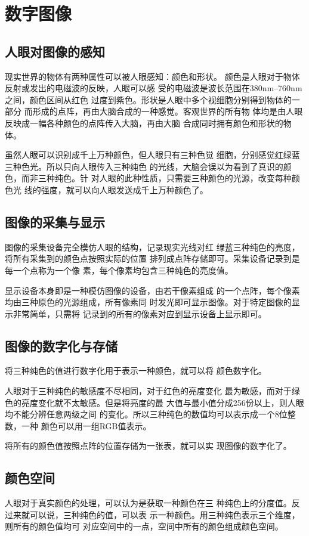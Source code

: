 \documentclass[11pt]{article}
\begin{document}
\section{数字图像}
\subsection{人眼对图像的感知}
    现实世界的物体有两种属性可以被人眼感知：颜色和形状。
颜色是人眼对于物体反射或发出的电磁波的反映，人眼可以感
受的电磁波是波长范围在380nm--760nm之间，颜色区间从红色
过度到紫色。形状是人眼中多个视细胞分别得到物体的一部分
而形成的点阵，再由大脑合成的一种感觉。客观世界的所有物
体均是由人眼反映成一幅各种颜色的点阵传入大脑，再由大脑
合成同时拥有颜色和形状的物体。

    虽然人眼可以识别成千上万种颜色，但人眼只有三种色觉
细胞，分别感觉红绿蓝三种色光。所以只向人眼传入三种纯色
的光线，大脑会误以为看到了真识的颜色，而非三种纯色。针
对人眼的此种性质，只需要三种颜色的光源，改变每种颜色光
线的强度，就可以向人眼发送成千上万种颜色了。
\subsection{图像的采集与显示}
    图像的采集设备完全模仿人眼的结构，记录现实光线对红
绿蓝三种纯色的亮度，将所有采集到的颜色点按照实际的位置
排列成点阵存储即可。采集设备记录到是每一个点称为一个像
素，每个像素均包含三种纯色的亮度值。

    显示设备本身即是一种模仿图像的设备，由若干像素组成
的一个点阵，每个像素均由三种原色的光源组成，所有像素同
时发光即可显示图像。对于特定图像的显示非常简单，只需将
记录到的所有的像素对应到显示设备上显示即可。
\subsection{图像的数字化与存储}
    将三种纯色的值进行数字化用于表示一种颜色，就可以将
颜色数字化。

    人眼对于三种纯色的敏感度不尽相同，对于红色的亮度变化
最为敏感，而对于绿色的亮度变化就不太敏感。但是将亮度的最
大值与最小值分成256份以上，则人眼均不能分辨任意两级之间
的变化。所以三种纯色的数值均可以表示成一个8位整数，一种
颜色可以用一组RGB值表示。

    将所有的颜色值按照点阵的位置存储为一张表，就可以实
现图像的数字化了。
\subsection{颜色空间}
    人眼对于真实颜色的处理，可以认为是获取一种颜色在三
种纯色上的分度值。反过来就可以说，三种纯色的值，可以表
示一种颜色。用三种纯色表示三个维度，则所有的颜色值均可
对应空间中的一点，空间中所有的颜色组成颜色空间。
\end{document}
